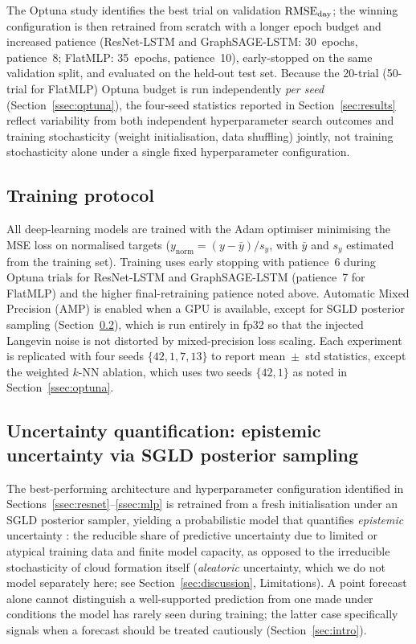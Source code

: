 The Optuna study identifies the best trial on validation $\text{RMSE}_\text{day}$; the
winning configuration is then retrained from scratch with a longer epoch
budget and increased patience (ResNet-LSTM and GraphSAGE-LSTM: 30~epochs,
patience~8; FlatMLP: 35~epochs, patience~10), early-stopped on the same
validation split, and evaluated on the held-out test set. Because the
20-trial (50-trial for FlatMLP) Optuna budget is run independently
\emph{per seed} (Section~\ref{ssec:optuna}), the four-seed statistics
reported in Section~\ref{sec:results} reflect variability from both
independent hyperparameter search outcomes and training stochasticity
(weight initialisation, data shuffling) jointly, not training stochasticity
alone under a single fixed hyperparameter configuration.

\subsection{Training protocol}

All deep-learning models are trained with the Adam optimiser minimising the MSE
loss on normalised targets ($y_\text{norm} = (y - \bar{y}) / s_y$, with $\bar{y}$
and $s_y$ estimated from the training set). Training uses early stopping with
patience~6 during Optuna trials for ResNet-LSTM and GraphSAGE-LSTM (patience~7
for FlatMLP) and the higher final-retraining patience noted above. Automatic
Mixed Precision (AMP) is enabled when a GPU is available, except for SGLD
posterior sampling (Section~\ref{ssec:uq}), which is run entirely in fp32 so
that the injected Langevin noise is not distorted by mixed-precision loss
scaling. Each experiment is replicated with four seeds
$\{42, 1, 7, 13\}$ to report mean~$\pm$~std statistics, except the weighted
$k$-NN ablation, which uses two seeds $\{42, 1\}$ as noted in
Section~\ref{ssec:optuna}.

\subsection{Uncertainty quantification: epistemic uncertainty via SGLD posterior sampling}
\label{ssec:uq}

The best-performing architecture and hyperparameter configuration identified
in Sections~\ref{ssec:resnet}--\ref{ssec:mlp} is retrained from a fresh
initialisation under an SGLD posterior sampler, yielding a probabilistic
model that quantifies \emph{epistemic}
uncertainty \cite{kendall2017}: the reducible share of predictive uncertainty
due to limited or atypical training data and finite model capacity, as
opposed to the irreducible stochasticity of cloud formation itself
(\emph{aleatoric} uncertainty, which we do not model separately here; see
Section~\ref{sec:discussion}, Limitations). A point forecast alone cannot
distinguish a well-supported prediction from one made under conditions the
model has rarely seen during training; the latter case specifically signals
when a forecast should be treated cautiously (Section~\ref{sec:intro}).

